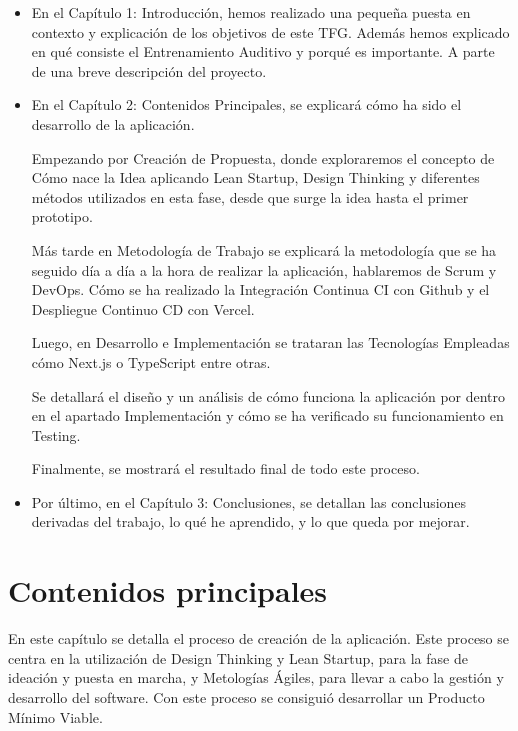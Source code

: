 \documentclass[12pt,twoside,titlepage]{report}
\newcommand\blankpage{%
    \newpage
    \null
    \thispagestyle{empty}%
    \newpage}
\begin{document}
\begin{itemize}

    \item En el Capítulo 1: Introducción, hemos realizado una pequeña puesta en contexto y explicación de los objetivos de este TFG. Además hemos explicado en qué consiste el Entrenamiento Auditivo y porqué es importante. A parte de una breve descripción del proyecto.
    \item En el Capítulo 2: Contenidos Principales, se explicará cómo ha sido el desarrollo de la aplicación.
    
    Empezando por Creación de Propuesta, donde exploraremos el concepto de Cómo nace la Idea aplicando Lean Startup, Design Thinking y diferentes métodos utilizados en esta fase, desde que surge la idea hasta el primer prototipo.

    Más tarde en Metodología de Trabajo se explicará la metodología que se ha seguido día a día a la hora de realizar la aplicación, hablaremos de Scrum y DevOps. Cómo se ha realizado la Integración Continua CI con Github y el Despliegue Continuo CD con Vercel.
    
    Luego, en Desarrollo e Implementación se trataran las Tecnologías Empleadas cómo Next.js o TypeScript entre otras. 
    
    Se detallará el diseño y un análisis de cómo funciona la aplicación por dentro en el apartado Implementación y cómo se ha verificado su funcionamiento en Testing. 
    
    Finalmente, se mostrará el resultado final de todo este proceso.
    \item Por último, en el Capítulo 3: Conclusiones, se detallan las conclusiones derivadas del trabajo, lo qué he aprendido, y lo que queda por mejorar.

\end{itemize}




\chapter{Contenidos principales}
\label{chap:contenidos}

En este capítulo se detalla el proceso de creación de la aplicación. Este proceso se centra en la utilización de Design Thinking y Lean Startup, para la fase de ideación y puesta en marcha, y Metologías Ágiles, para llevar a cabo la gestión y desarrollo del software. Con este proceso se consiguió desarrollar un Producto Mínimo Viable. 
\end{document}
